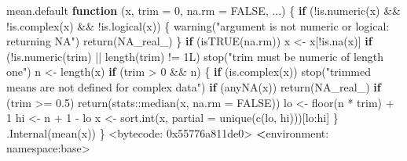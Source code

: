 \documentclass[
  10pt,
  a4paper]{book}
\newenvironment{Shaded}{\begin{snugshade}}{\end{snugshade}}
\newcommand{\AttributeTok}[1]{\textcolor[rgb]{0.77,0.63,0.00}{#1}}
\newcommand{\ConstantTok}[1]{\textcolor[rgb]{0.00,0.00,0.00}{#1}}
\newcommand{\ControlFlowTok}[1]{\textcolor[rgb]{0.13,0.29,0.53}{\textbf{#1}}}
\newcommand{\DecValTok}[1]{\textcolor[rgb]{0.00,0.00,0.81}{#1}}
\newcommand{\ErrorTok}[1]{\textcolor[rgb]{0.64,0.00,0.00}{\textbf{#1}}}
\newcommand{\FloatTok}[1]{\textcolor[rgb]{0.00,0.00,0.81}{#1}}
\newcommand{\FunctionTok}[1]{\textcolor[rgb]{0.00,0.00,0.00}{#1}}
\newcommand{\NormalTok}[1]{#1}
\newcommand{\OtherTok}[1]{\textcolor[rgb]{0.56,0.35,0.01}{#1}}
\newcommand{\SpecialCharTok}[1]{\textcolor[rgb]{0.00,0.00,0.00}{#1}}
\newcommand{\StringTok}[1]{\textcolor[rgb]{0.31,0.60,0.02}{#1}}
\begin{document}
\begin{Shaded}
\begin{Highlighting}[]
\NormalTok{mean.default}
\ControlFlowTok{function}\NormalTok{ (x, }\AttributeTok{trim =} \DecValTok{0}\NormalTok{, }\AttributeTok{na.rm =} \ConstantTok{FALSE}\NormalTok{, ...) }
\NormalTok{\{}
    \ControlFlowTok{if}\NormalTok{ (}\SpecialCharTok{!}\FunctionTok{is.numeric}\NormalTok{(x) }\SpecialCharTok{\&\&} \SpecialCharTok{!}\FunctionTok{is.complex}\NormalTok{(x) }\SpecialCharTok{\&\&} \SpecialCharTok{!}\FunctionTok{is.logical}\NormalTok{(x)) \{}
        \FunctionTok{warning}\NormalTok{(}\StringTok{"argument is not numeric or logical: returning NA"}\NormalTok{)}
        \FunctionTok{return}\NormalTok{(}\ConstantTok{NA\_real\_}\NormalTok{)}
\NormalTok{    \}}
    \ControlFlowTok{if}\NormalTok{ (}\FunctionTok{isTRUE}\NormalTok{(na.rm)) }
\NormalTok{        x }\OtherTok{\textless{}{-}}\NormalTok{ x[}\SpecialCharTok{!}\FunctionTok{is.na}\NormalTok{(x)]}
    \ControlFlowTok{if}\NormalTok{ (}\SpecialCharTok{!}\FunctionTok{is.numeric}\NormalTok{(trim) }\SpecialCharTok{||} \FunctionTok{length}\NormalTok{(trim) }\SpecialCharTok{!=}\NormalTok{ 1L) }
        \FunctionTok{stop}\NormalTok{(}\StringTok{"\textquotesingle{}trim\textquotesingle{} must be numeric of length one"}\NormalTok{)}
\NormalTok{    n }\OtherTok{\textless{}{-}} \FunctionTok{length}\NormalTok{(x)}
    \ControlFlowTok{if}\NormalTok{ (trim }\SpecialCharTok{\textgreater{}} \DecValTok{0} \SpecialCharTok{\&\&}\NormalTok{ n) \{}
        \ControlFlowTok{if}\NormalTok{ (}\FunctionTok{is.complex}\NormalTok{(x)) }
            \FunctionTok{stop}\NormalTok{(}\StringTok{"trimmed means are not defined for complex data"}\NormalTok{)}
        \ControlFlowTok{if}\NormalTok{ (}\FunctionTok{anyNA}\NormalTok{(x)) }
            \FunctionTok{return}\NormalTok{(}\ConstantTok{NA\_real\_}\NormalTok{)}
        \ControlFlowTok{if}\NormalTok{ (trim }\SpecialCharTok{\textgreater{}=} \FloatTok{0.5}\NormalTok{) }
            \FunctionTok{return}\NormalTok{(stats}\SpecialCharTok{::}\FunctionTok{median}\NormalTok{(x, }\AttributeTok{na.rm =} \ConstantTok{FALSE}\NormalTok{))}
\NormalTok{        lo }\OtherTok{\textless{}{-}} \FunctionTok{floor}\NormalTok{(n }\SpecialCharTok{*}\NormalTok{ trim) }\SpecialCharTok{+} \DecValTok{1}
\NormalTok{        hi }\OtherTok{\textless{}{-}}\NormalTok{ n }\SpecialCharTok{+} \DecValTok{1} \SpecialCharTok{{-}}\NormalTok{ lo}
\NormalTok{        x }\OtherTok{\textless{}{-}} \FunctionTok{sort.int}\NormalTok{(x, }\AttributeTok{partial =} \FunctionTok{unique}\NormalTok{(}\FunctionTok{c}\NormalTok{(lo, hi)))[lo}\SpecialCharTok{:}\NormalTok{hi]}
\NormalTok{    \}}
    \FunctionTok{.Internal}\NormalTok{(}\FunctionTok{mean}\NormalTok{(x))}
\NormalTok{\}}
\SpecialCharTok{\textless{}}\NormalTok{bytecode}\SpecialCharTok{:} \DecValTok{0x55776a811de0}\SpecialCharTok{\textgreater{}}
\ErrorTok{\textless{}}\NormalTok{environment}\SpecialCharTok{:}\NormalTok{ namespace}\SpecialCharTok{:}\NormalTok{base}\SpecialCharTok{\textgreater{}}
\end{Highlighting}
\end{Shaded}
\end{document}
